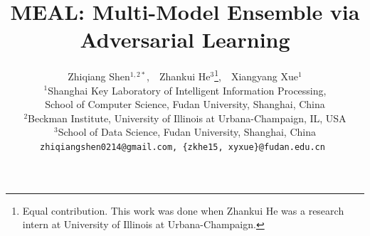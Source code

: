 \documentclass[letterpaper]{article} %
\begin{document}
%
\title{MEAL: Multi-Model Ensemble via Adversarial Learning}
\author{Zhiqiang Shen$^{1,2*}$,~~Zhankui He$^{3}$\thanks{Equal contribution. This work was done when Zhankui He was a research intern at University of Illinois at Urbana-Champaign.},~~Xiangyang Xue$^{1}$\\
	$^1$Shanghai Key Laboratory of Intelligent Information Processing, \\ School of Computer Science, Fudan University, Shanghai, China \\
	$^2$Beckman Institute, University of Illinois at Urbana-Champaign, IL, USA\\
	$^3$School of Data Science, Fudan University, Shanghai, China\\
	\tt\small zhiqiangshen0214@gmail.com,
	\tt\small \{zkhe15, xyxue\}@fudan.edu.cn
}
\maketitle
\end{document}
